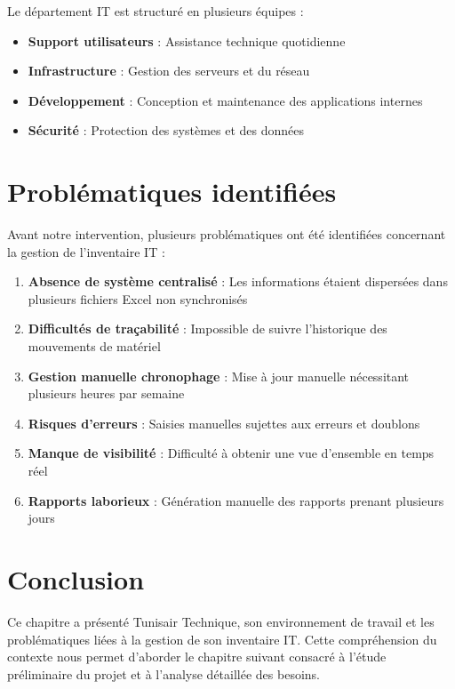 \documentclass[12pt,a4paper]{report}
\begin{document}
Le département IT est structuré en plusieurs équipes :

\begin{itemize}
    \item \textbf{Support utilisateurs} : Assistance technique quotidienne
    \item \textbf{Infrastructure} : Gestion des serveurs et du réseau
    \item \textbf{Développement} : Conception et maintenance des applications internes
    \item \textbf{Sécurité} : Protection des systèmes et des données
\end{itemize}

\section{Problématiques identifiées}

Avant notre intervention, plusieurs problématiques ont été identifiées concernant la gestion de l'inventaire IT :

\begin{enumerate}
    \item \textbf{Absence de système centralisé} : Les informations étaient dispersées dans plusieurs fichiers Excel non synchronisés
    
    \item \textbf{Difficultés de traçabilité} : Impossible de suivre l'historique des mouvements de matériel
    
    \item \textbf{Gestion manuelle chronophage} : Mise à jour manuelle nécessitant plusieurs heures par semaine
    
    \item \textbf{Risques d'erreurs} : Saisies manuelles sujettes aux erreurs et doublons
    
    \item \textbf{Manque de visibilité} : Difficulté à obtenir une vue d'ensemble en temps réel
    
    \item \textbf{Rapports laborieux} : Génération manuelle des rapports prenant plusieurs jours
\end{enumerate}

\section{Conclusion}

Ce chapitre a présenté Tunisair Technique, son environnement de travail et les problématiques liées à la gestion de son inventaire IT. Cette compréhension du contexte nous permet d'aborder le chapitre suivant consacré à l'étude préliminaire du projet et à l'analyse détaillée des besoins.
\end{document}
